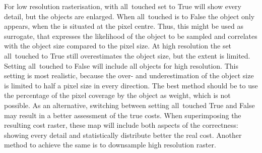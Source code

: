 	



For low resolution rasterisation, with all~touched set to True will show every detail, but the objects are enlarged.
When all~touched is to False the object only appears, when the is situated at the pixel centre.
Thus, this might be used as surrogate, that expresses the likelihood of the object to be sampled and correlates with the object size  compared to the pixel size.
At high resolution the set all~touched to True still overestimates the object size, but the extent is limited.
Setting all~touched to False will include all objects for high resolution.
This setting is most realistic, because the over- and underestimation of the object size is limited to half a pixel size in every direction.
The best method should be to use the percentage of the pixel coverage by the object as weight, which is not possible.
As an alternative, switching between setting all~touched True and False may result in a better assessment of the true costs.
When superimposing the resulting cost raster, these map will include both aspects of the correctness: showing every detail and statistically distribute better the real cost.
Another method to achieve the same is to downsample high resolution raster.